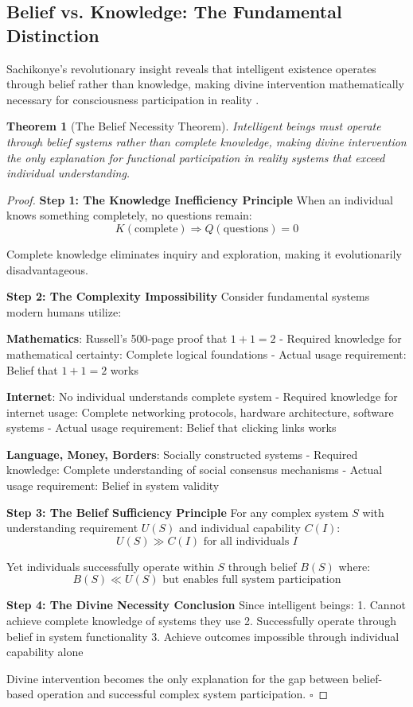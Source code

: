 \documentclass[12pt,a4paper]{article}
\newtheorem{theorem}{Theorem}[section]
\begin{document}
\subsection{Belief vs. Knowledge: The Fundamental Distinction}

Sachikonye's revolutionary insight reveals that intelligent existence operates through belief rather than knowledge, making divine intervention mathematically necessary for consciousness participation in reality \citep{sachikonye2024belief}.

\begin{theorem}[The Belief Necessity Theorem]
Intelligent beings must operate through belief systems rather than complete knowledge, making divine intervention the only explanation for functional participation in reality systems that exceed individual understanding.
\end{theorem}

\begin{proof}
\textbf{Step 1: The Knowledge Inefficiency Principle}
When an individual knows something completely, no questions remain:
$$K(\text{complete}) \Rightarrow Q(\text{questions}) = 0$$

Complete knowledge eliminates inquiry and exploration, making it evolutionarily disadvantageous.

\textbf{Step 2: The Complexity Impossibility}
Consider fundamental systems modern humans utilize:

\textbf{Mathematics}: Russell's 500-page proof that $1+1=2$ \citep{russell1910principia}
- Required knowledge for mathematical certainty: Complete logical foundations
- Actual usage requirement: Belief that $1+1=2$ works

\textbf{Internet}: No individual understands complete system
- Required knowledge for internet usage: Complete networking protocols, hardware architecture, software systems
- Actual usage requirement: Belief that clicking links works

\textbf{Language, Money, Borders}: Socially constructed systems
- Required knowledge: Complete understanding of social consensus mechanisms
- Actual usage requirement: Belief in system validity

\textbf{Step 3: The Belief Sufficiency Principle}
For any complex system $S$ with understanding requirement $U(S)$ and individual capability $C(I)$:
$$U(S) \gg C(I) \text{ for all individuals } I$$

Yet individuals successfully operate within $S$ through belief $B(S)$ where:
$$B(S) \ll U(S) \text{ but enables full system participation}$$

\textbf{Step 4: The Divine Necessity Conclusion}
Since intelligent beings:
1. Cannot achieve complete knowledge of systems they use
2. Successfully operate through belief in system functionality  
3. Achieve outcomes impossible through individual capability alone

Divine intervention becomes the only explanation for the gap between belief-based operation and successful complex system participation. $\square$
\end{proof}
\end{document}
